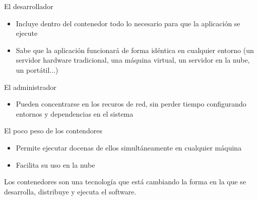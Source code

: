\documentclass[ucs]{beamer}
\begin{document}
\begin{frame}[fragile]

El desarrollador
\begin{itemize}

\item
Incluye dentro del contenedor todo lo necesario para que la aplicación se ejecute 

\item
Sabe que la aplicación funcionará de forma idéntica en cualquier entorno
(un servidor hardware tradicional, una máquina virtual, un servidor en la nube, un portátil...)

\end{itemize}


El administrador 

\begin{itemize}
\item
Pueden concentrarse en los recuros de red, sin perder tiempo configurando entornos y dependencias en el sistema
\end{itemize}


El poco peso de los contendores

\begin{itemize}
\item
Permite ejecutar docenas de ellos simultáneamente en cualquier máquina
\item
Facilita su uso en la nube
\end{itemize}

Los contenedores son una tecnología que está cambiando la forma en la que se desarrolla, distribuye
y ejecuta el software.



\end{frame}
\end{document}
